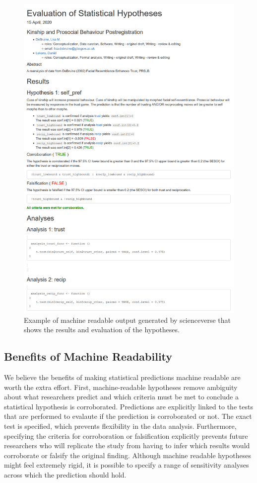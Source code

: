 \documentclass[english,doc,floatsintext]{apa6}
\begin{document}
\begin{figure}[htbp]
\centering
\includegraphics{images/output.png}
\caption{Example of machine readable output generated by scienceverse that shows the results and evaluation of the hypotheses. \label{fig1}}
\end{figure}

\hypertarget{benefits-of-machine-readability}{%
\subsection{Benefits of Machine Readability}\label{benefits-of-machine-readability}}

We believe the benefits of making statistical predictions machine readable are worth the extra effort. First, machine-readable hypotheses remove ambiguity about what researchers predict and which criteria must be met to conclude a statistical hypothesis is corroborated. Predictions are explicitly linked to the tests that are performed to evalaute if the prediction is corroborated or not. The exact test is specified, which prevents flexibility in the data analysis. Furthermore, specifying the criteria for corroboration or falsification explicitly prevents future researchers who will replicate the study from having to infer which results would corroborate or falsify the original finding. Although machine readable hypotheses might feel extremely rigid, it is possible to specify a range of sensitivity analyses across which the prediction should hold.
\end{document}
